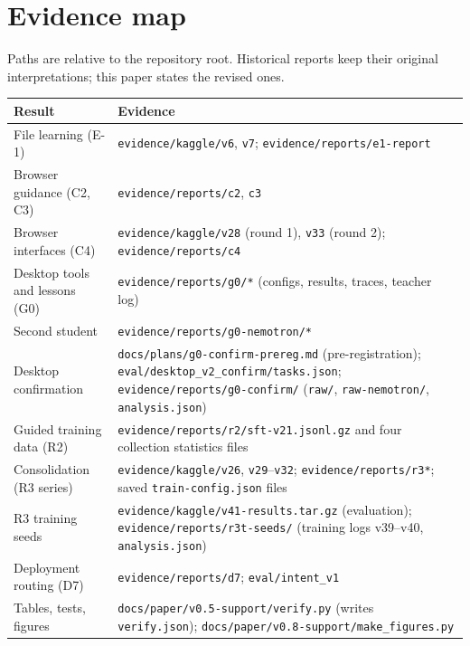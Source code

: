 \documentclass[
  10pt,
]{article}
\newcounter{none} %
\begin{document}
\normalsize

\appendix

\section{Evidence map}\label{evidence-map}

Paths are relative to the repository root. Historical reports keep their
original interpretations; this paper states the revised ones.

{\def\LTcaptype{none} %
\begin{longtable}[]{@{}
  >{\raggedright\arraybackslash}p{}
  >{\raggedright\arraybackslash}p{}@{}}
\toprule\noalign{}
\begin{minipage}[b]{\linewidth}\raggedright
Result
\end{minipage} & \begin{minipage}[b]{\linewidth}\raggedright
Evidence
\end{minipage} \\
\midrule\noalign{}
\endhead
\bottomrule\noalign{}
\endlastfoot
File learning (E-1) & \texttt{evidence/kaggle/v6}, \texttt{v7};
\texttt{evidence/reports/e1-report} \\
Browser guidance (C2, C3) & \texttt{evidence/reports/c2}, \texttt{c3} \\
Browser interfaces (C4) & \texttt{evidence/kaggle/v28} (round 1),
\texttt{v33} (round 2); \texttt{evidence/reports/c4} \\
Desktop tools and lessons (G0) & \texttt{evidence/reports/g0/*}
(configs, results, traces, teacher log) \\
Second student & \texttt{evidence/reports/g0-nemotron/*} \\
Desktop confirmation & \texttt{docs/plans/g0-confirm-prereg.md}
(pre-registration); \texttt{eval/desktop\_v2\_confirm/tasks.json};
\texttt{evidence/reports/g0-confirm/} (\texttt{raw/},
\texttt{raw-nemotron/}, \texttt{analysis.json}) \\
Guided training data (R2) &
\texttt{evidence/reports/r2/sft-v21.jsonl.gz} and four collection
statistics files \\
Consolidation (R3 series) & \texttt{evidence/kaggle/v26},
\texttt{v29}--\texttt{v32}; \texttt{evidence/reports/r3*}; saved
\texttt{train-config.json} files \\
R3 training seeds & \texttt{evidence/kaggle/v41-results.tar.gz}
(evaluation); \texttt{evidence/reports/r3t-seeds/} (training logs
v39--v40, \texttt{analysis.json}) \\
Deployment routing (D7) & \texttt{evidence/reports/d7};
\texttt{eval/intent\_v1} \\
Tables, tests, figures & \texttt{docs/paper/v0.5-support/verify.py}
(writes \texttt{verify.json});
\texttt{docs/paper/v0.8-support/make\_figures.py} \\
\end{longtable}
}
\end{document}
